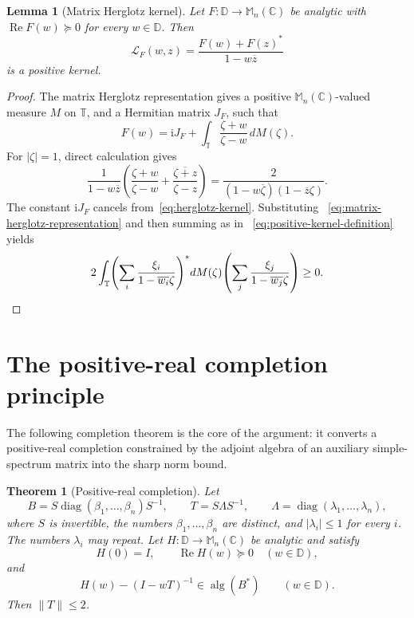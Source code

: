 \documentclass[preprints,article,submit,oneauthor]{Definitions/mdpi}
\newcounter{manuscriptresult}[section]
\theoremstyle{mdpi}
\newtheorem{theorem}[manuscriptresult]{Theorem}
\newtheorem{lemma}[manuscriptresult]{Lemma}
\theoremstyle{definition}
\newcommand{\C}{\mathbb C}
\newcommand{\D}{\mathbb D}
\newcommand{\Torus}{\mathbb T}
\newcommand{\Mn}{\mathbb M_n(\C)}
\newcommand{\alg}{\operatorname{alg}}
\newcommand{\RePart}{\operatorname{Re}}
\newcommand{\diag}{\operatorname{diag}}
\newcommand{\iu}{\mathrm{i}}
\begin{document}
\begin{lemma}[Matrix Herglotz kernel]
\label{lem:herglotz-kernel}
Let $F\colon\D\to\Mn$ be analytic with
$\RePart F(w)\succeq0$ for every $w\in\D$.  Then
\begin{equation}
  \mathcal L_F(w,z)
  =\frac{F(w)+F(z)^*}{1-w\overline z}
  \label{eq:herglotz-kernel}
\end{equation}
is a positive kernel.
\end{lemma}

\begin{proof}
The matrix Herglotz representation gives a positive
$\Mn$-valued measure $M$ on $\Torus$, and a Hermitian matrix $J_F$, such
that
\begin{equation}
  F(w)=\iu J_F+\int_{\Torus}\frac{\zeta+w}{\zeta-w}\,dM(\zeta).
  \label{eq:matrix-herglotz-representation}
\end{equation}
For $\lvert\zeta\rvert=1$, direct calculation gives
\begin{equation}
  \frac{1}{1-w\overline z}\left(
   \frac{\zeta+w}{\zeta-w}
   +\overline{\frac{\zeta+z}{\zeta-z}}
  \right)
  =\frac{2}{(1-w\overline\zeta)(1-\overline z\zeta)}.
  \label{eq:scalar-herglotz-factorization}
\end{equation}
The constant $\iu J_F$ cancels from~\eqref{eq:herglotz-kernel}.  Substituting~%
\eqref{eq:matrix-herglotz-representation} and then summing as in~%
\eqref{eq:positive-kernel-definition} yields
\[
  2\int_{\Torus}
  \left(\sum_i\frac{\xi_i}{1-\overline{w_i}\zeta}\right)^*
  dM(\zeta)
  \left(\sum_j\frac{\xi_j}{1-\overline{w_j}\zeta}\right)
  \geq0.\qedhere
\]
\end{proof}

\section{The positive-real completion principle}
\label{sec:completion}

The following completion theorem is the core of the argument: it
converts a positive-real completion constrained by the adjoint algebra
of an auxiliary simple-spectrum matrix into the sharp norm bound.

\begin{theorem}[Positive-real completion]
\label{thm:completion}
Let
\begin{equation}
  B=S\diag(\beta_1,\ldots,\beta_n)S^{-1},
  \qquad
  T=S\Lambda S^{-1},
  \qquad
  \Lambda=\diag(\lambda_1,\ldots,\lambda_n),
  \label{eq:T-diagonalization}
\end{equation}
where $S$ is invertible, the numbers $\beta_1,\ldots,\beta_n$ are
distinct, and $\lvert\lambda_i\rvert\leq1$ for every $i$.  The numbers
$\lambda_i$ may repeat.
Let $H\colon\D\to\Mn$ be analytic and satisfy
\begin{equation}
  H(0)=I,\qquad \RePart H(w)\succeq0\quad(w\in\D),
  \label{eq:completion-positive-real}
\end{equation}
and
\begin{equation}
  H(w)-(I-wT)^{-1}\in\alg(B^*)\qquad(w\in\D).
  \label{eq:completion-algebra-condition}
\end{equation}
Then $\lVert T\rVert\leq2$.
\end{theorem}
\end{document}
